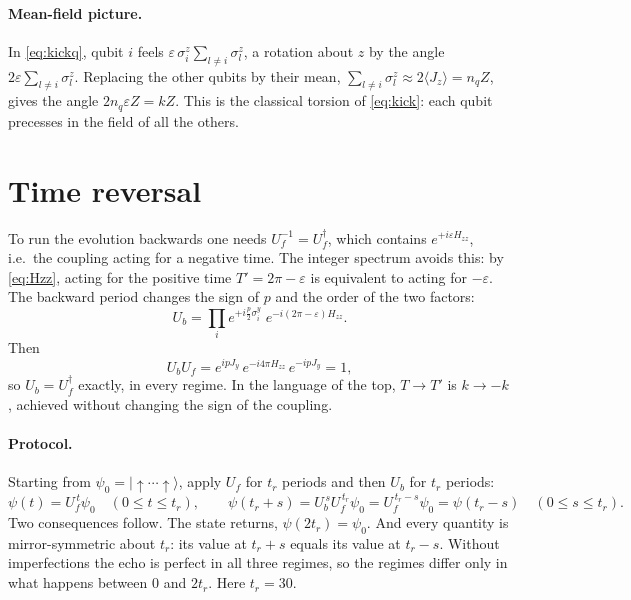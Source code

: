 \documentclass[11pt,a4paper]{article}
\begin{document}
\paragraph{Mean-field picture.}
In \cref{eq:kickq}, qubit $i$ feels $\varepsilon\,\sigma^z_i\sum_{l\ne i}\sigma^z_l$, a rotation about $z$ by the angle
$2\varepsilon\sum_{l\ne i}\sigma^z_l$. Replacing the other qubits by their mean, $\sum_{l\ne i}\sigma^z_l\approx
2\langle J_z\rangle = n_qZ$, gives the angle $2n_q\varepsilon Z = kZ$. This is the classical torsion of \cref{eq:kick}:
each qubit precesses in the field of all the others.

\section{Time reversal}\label{sec:reversal}

To run the evolution backwards one needs $U_f^{-1} = U_f^\dagger$, which contains $e^{+i\varepsilon H_{zz}}$, i.e.\ the
coupling acting for a negative time. The integer spectrum avoids this: by \cref{eq:Hzz}, acting for the positive time
$T'=2\pi-\varepsilon$ is equivalent to acting for $-\varepsilon$. The backward period changes the sign of $p$ and the
order of the two factors:
\begin{equation}\label{eq:Ub}
  U_b = \prod_{i}e^{+i\frac p2\sigma^y_i}\;e^{-i(2\pi-\varepsilon)H_{zz}} .
\end{equation}
Then
\begin{equation}
  U_bU_f = e^{ipJ_y}\,e^{-i4\pi H_{zz}}\,e^{-ipJ_y} = 1 ,
\end{equation}
so $U_b = U_f^\dagger$ exactly, in every regime. In the language of the top, $T\to T'$ is $k\to-k$, achieved without
changing the sign of the coupling.

\paragraph{Protocol.}
Starting from $\psi_0=|{\uparrow\cdots\uparrow}\rangle$, apply $U_f$ for $t_r$ periods and then $U_b$ for $t_r$ periods:
\begin{equation}
  \psi(t) = U_f^{\,t}\psi_0\quad (0\le t\le t_r),\qquad
  \psi(t_r+s) = U_b^{\,s}U_f^{\,t_r}\psi_0 = U_f^{\,t_r-s}\psi_0 = \psi(t_r-s)\quad(0\le s\le t_r).
\end{equation}
Two consequences follow. The state returns, $\psi(2t_r)=\psi_0$. And every quantity is mirror-symmetric about $t_r$:
its value at $t_r+s$ equals its value at $t_r-s$. Without imperfections the echo is perfect in all three regimes, so the
regimes differ only in what happens between $0$ and $2t_r$. Here $t_r=30$.
\end{document}
